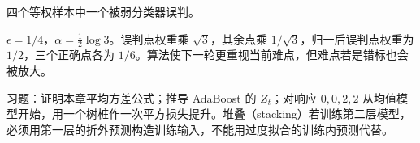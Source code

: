 \begin{example}[提升如何重分配注意力]
四个等权样本中一个被弱分类器误判。
\end{example}
\begin{solve}
$\epsilon=1/4$，$\alpha=\frac12\log3$。误判点权重乘 $\sqrt3$，其余点乘 $1/\sqrt3$，归一后误判点权重为 $1/2$，三个正确点各为 $1/6$。算法使下一轮更重视当前难点，但难点若是错标也会被放大。
\end{solve}

习题：证明本章平均方差公式；推导 AdaBoost 的 $Z_t$；对响应 $0,0,2,2$ 从均值模型开始，用一个树桩作一次平方损失提升。堆叠（stacking）若训练第二层模型，必须用第一层的折外预测构造训练输入，不能用过度拟合的训练内预测代替。





